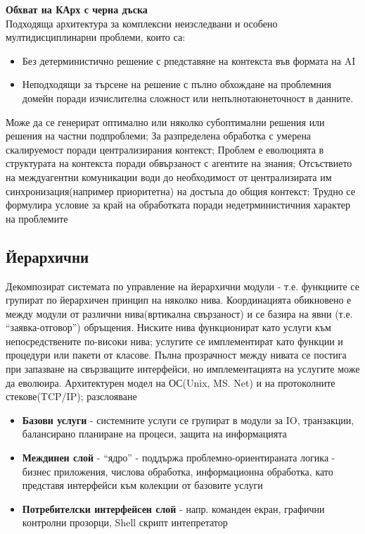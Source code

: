 \documentclass[11pt]{article} %
\begin{document}
\textbf{Обхват на КАрх с черна дъска}\\
Подходяща архитектура за комплексни неизследвани и особено мултидисциплинарни проблеми, които са:
\begin{itemize}[noitemsep]
	\item Без детерминистично решение с рпедставяне на контекста във формата на AI
	\item Неподходящи за търсене на решение с пълно обхождане на проблемния домейн поради изчислителна сложност или непълнотаюнеточност в данните.
\end{itemize}
Може да се генерират оптимално или няколко субоптимални решения или решения на частни подпроблеми; За разпределена обработка с умерена скалируемост поради централизирания контекст; Проблем е еволюцията в структурата на контекста поради обвързаност с агентите на знания; Отсъствието на междуагентни комуникации води до необходимост от централизирата им синхронизация(например приоритетна) на достъпа до общия контекст; Трудно се формулира условие за край на обработката поради недетрминистичния характер на проблемите

\subsection{Йерархични}
Декомпозират системата по управление на йерархични модули - т.е. функциите се групират по йерархичен принцип на няколко нива. Координацията обикновено е между модули от различни нива(вртикална свързаност) и се базира на явни (т.е. \enquote{заявка-отговор}) обръщения. Ниските нива функционират като услуги към непосредствените по-високи нива; услугите се имплементират като функции и процедури или пакети от класове. Пълна прозрачност между нивата се постига при запазване на свързващите интерфейси, но имплементацията на услугите може да еволюира. Архитектурен модел на ОС(Unix, MS. Net) и на протоколните стекове(TCP/IP); разслояване
\begin{itemize}[noitemsep]
	\item \textbf{Базови услуги} - системните услуги се групират в модули за IO, транзакции, балансирано планиране на процеси, защита на информацията
	\item \textbf{Междинен слой} - \enquote{ядро} - поддържа проблемно-ориентираната логика - бизнес приложения, числова обработка, информационна обработка, като представя интерфейси към колекции от базовите услуги
	\item \textbf{Потребителски интерфейсен слой} - напр. команден екран, графични контролни прозорци, Shell скрипт интепретатор
\end{itemize}
\end{document}

